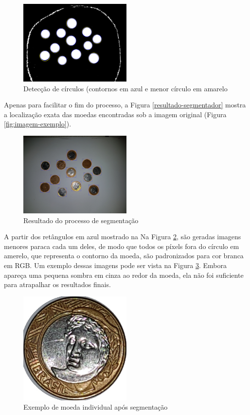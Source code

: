 \documentclass[10pt,journal,compsoc]{IEEEtran}
\begin{document}
\begin{figure}[h]
\centering
\caption{Detecção de círculos (contornos em azul e menor círculo em amarelo}
\label{fig:circulos}
\includegraphics[width=0.5\textwidth]{circulos.jpg}
\end{figure}

Apenas para facilitar o fim do processo, a Figura \ref{resultado-segmentador} mostra a localização exata das moedas encontradas sob a imagem original (Figura \ref{fig:imagem-exemplo}).

\begin{figure}[h]
\centering
\caption{Resultado do processo de segmentação}
\label{fig:resultado-segmentador}
\includegraphics[width=0.5\textwidth]{resultado-segmentador.jpg}
\end{figure}

A partir dos retângulos em azul mostrado na Na Figura \ref{fig:resultado-segmentador}, são geradas imagens menores paraca cada um deles, de modo que todos os píxels fora do círculo em amerelo, que representa o contorno da moeda, são padronizados para cor branca em RGB. Um exemplo dessas imagens pode ser vista na Figura \ref{fig:moeda-individual}. Embora apareça uma pequena sombra em cinza ao redor da moeda, ela não foi suficiente para atrapalhar os resultados finais.

\begin{figure}[ht]
\centering
\caption{Exemplo de moeda individual após segmentação}
\label{fig:moeda-individual}
\includegraphics[width=0.5\textwidth]{moeda-individual.jpg}
\end{figure}
\end{document}
